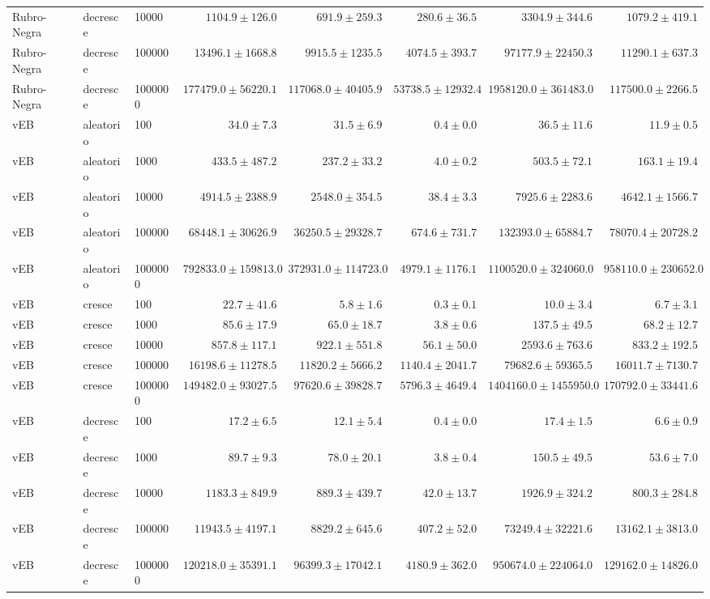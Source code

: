 \begin{table}[htbp]
\begin{tabular}{lllrrrrr}
    Rubro-Negra & decresce & 10000 & $1104.9 \pm 126.0$ & $691.9 \pm 259.3$ & $280.6 \pm 36.5$ & $3304.9 \pm 344.6$ & $1079.2 \pm 419.1$ \\
    Rubro-Negra & decresce & 100000 & $13496.1 \pm 1668.8$ & $9915.5 \pm 1235.5$ & $4074.5 \pm 393.7$ & $97177.9 \pm 22450.3$ & $11290.1 \pm 637.3$ \\
    Rubro-Negra & decresce & 1000000 & $177479.0 \pm 56220.1$ & $117068.0 \pm 40405.9$ & $53738.5 \pm 12932.4$ & $1958120.0 \pm 361483.0$ & $117500.0 \pm 2266.5$ \\
    \midrule
    vEB & aleatorio & 100 & $34.0 \pm 7.3$ & $31.5 \pm 6.9$ & $0.4 \pm 0.0$ & $36.5 \pm 11.6$ & $11.9 \pm 0.5$ \\
    vEB & aleatorio & 1000 & $433.5 \pm 487.2$ & $237.2 \pm 33.2$ & $4.0 \pm 0.2$ & $503.5 \pm 72.1$ & $163.1 \pm 19.4$ \\
    vEB & aleatorio & 10000 & $4914.5 \pm 2388.9$ & $2548.0 \pm 354.5$ & $38.4 \pm 3.3$ & $7925.6 \pm 2283.6$ & $4642.1 \pm 1566.7$ \\
    vEB & aleatorio & 100000 & $68448.1 \pm 30626.9$ & $36250.5 \pm 29328.7$ & $674.6 \pm 731.7$ & $132393.0 \pm 65884.7$ & $78070.4 \pm 20728.2$ \\
    vEB & aleatorio & 1000000 & $792833.0 \pm 159813.0$ & $372931.0 \pm 114723.0$ & $4979.1 \pm 1176.1$ & $1100520.0 \pm 324060.0$ & $958110.0 \pm 230652.0$ \\
    \midrule
    vEB & cresce & 100 & $22.7 \pm 41.6$ & $5.8 \pm 1.6$ & $0.3 \pm 0.1$ & $10.0 \pm 3.4$ & $6.7 \pm 3.1$ \\
    vEB & cresce & 1000 & $85.6 \pm 17.9$ & $65.0 \pm 18.7$ & $3.8 \pm 0.6$ & $137.5 \pm 49.5$ & $68.2 \pm 12.7$ \\
    vEB & cresce & 10000 & $857.8 \pm 117.1$ & $922.1 \pm 551.8$ & $56.1 \pm 50.0$ & $2593.6 \pm 763.6$ & $833.2 \pm 192.5$ \\
    vEB & cresce & 100000 & $16198.6 \pm 11278.5$ & $11820.2 \pm 5666.2$ & $1140.4 \pm 2041.7$ & $79682.6 \pm 59365.5$ & $16011.7 \pm 7130.7$ \\
    vEB & cresce & 1000000 & $149482.0 \pm 93027.5$ & $97620.6 \pm 39828.7$ & $5796.3 \pm 4649.4$ & $1404160.0 \pm 1455950.0$ & $170792.0 \pm 33441.6$ \\
    \midrule
    vEB & decresce & 100 & $17.2 \pm 6.5$ & $12.1 \pm 5.4$ & $0.4 \pm 0.0$ & $17.4 \pm 1.5$ & $6.6 \pm 0.9$ \\
    vEB & decresce & 1000 & $89.7 \pm 9.3$ & $78.0 \pm 20.1$ & $3.8 \pm 0.4$ & $150.5 \pm 49.5$ & $53.6 \pm 7.0$ \\
    vEB & decresce & 10000 & $1183.3 \pm 849.9$ & $889.3 \pm 439.7$ & $42.0 \pm 13.7$ & $1926.9 \pm 324.2$ & $800.3 \pm 284.8$ \\
    vEB & decresce & 100000 & $11943.5 \pm 4197.1$ & $8829.2 \pm 645.6$ & $407.2 \pm 52.0$ & $73249.4 \pm 32221.6$ & $13162.1 \pm 3813.0$ \\
    vEB & decresce & 1000000 & $120218.0 \pm 35391.1$ & $96399.3 \pm 17042.1$ & $4180.9 \pm 362.0$ & $950674.0 \pm 224064.0$ & $129162.0 \pm 14826.0$ \\
    \midrule
    \bottomrule
  \end{tabular}
\end{table}
